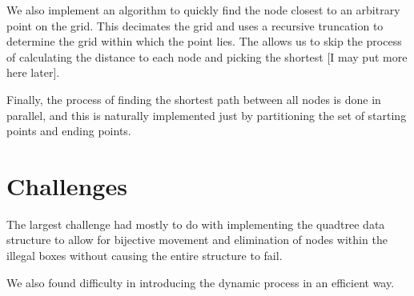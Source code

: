 \documentclass[10pt, letterpaper]{geneassignment}
\begin{document}
		We also implement an algorithm to quickly find the node closest to an arbitrary point on the grid. This decimates the grid and uses a recursive truncation to determine the grid within which the point lies. The allows us to skip the process of calculating the distance to each node and picking the shortest [I may put more here later].
		
		Finally, the process of finding the shortest path between all nodes is done in parallel, and this is naturally implemented just by partitioning the set of starting points and ending points.
		
	\section{Challenges}
		The largest challenge had mostly to do with implementing the quadtree data structure to allow for bijective movement and elimination of nodes within the illegal boxes without causing the entire structure to fail.
		
		We also found difficulty in introducing the dynamic process in an efficient way.
	
	
\end{document}
